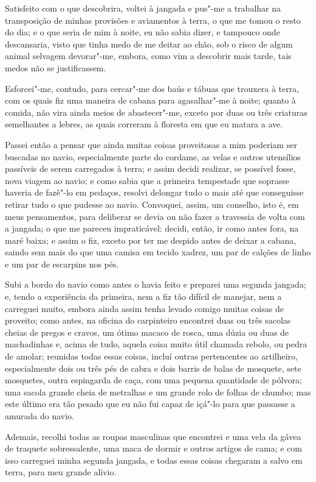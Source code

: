 Satisfeito com o que descobrira, voltei à jangada e pus"-me a trabalhar
na transposição de minhas provisões e aviamentos à terra, o que me tomou
o resto do dia; e o que seria de mim à noite, eu não sabia dizer, e
tampouco onde descansaria, visto que tinha medo de me deitar ao chão,
sob o risco de algum animal selvagem devorar"-me, embora, como vim a
descobrir mais tarde, tais medos não se justificassem.

Esforcei"-me, contudo, para cercar"-me dos baús e tábuas que trouxera à
terra, com os quais fiz uma maneira de cabana para agasalhar"-me à noite;
quanto à comida, não vira ainda meios de abastecer"-me, exceto por duas
ou três criaturas semelhantes a lebres, as quais correram à floresta em
que eu matara a ave.

Passei então a pensar que ainda muitas coisas proveitosas a mim poderiam
ser buscadas no navio, especialmente parte do cordame, as velas e outros
utensílios passíveis de serem carregados à terra; e assim decidi
realizar, se possível fosse, nova viagem ao navio; e como sabia que a
primeira tempestade que soprasse haveria de fazê"-lo em pedaços, resolvi
delongar tudo o mais até que conseguisse retirar tudo o que pudesse ao
navio. Convoquei, assim, um conselho, isto é, em meus pensamentos, para
deliberar se devia ou não fazer a travessia de volta com a jangada; o
que me pareceu impraticável: decidi, então, ir como antes fora, na maré
baixa; e assim o fiz, exceto por ter me despido antes de deixar a
cabana, saindo sem mais do que uma camisa em tecido xadrez, um par de
calções de linho e um par de escarpins nos pés.

Subi a bordo do navio como antes o havia feito e preparei uma segunda
jangada; e, tendo a experiência da primeira, nem a fiz tão difícil de
manejar, nem a carreguei muito, embora ainda assim tenha levado comigo
muitas coisas de proveito; como antes, na oficina do carpinteiro
encontrei duas ou três sacolas cheias de pregos e cravos, um ótimo
macaco de rosca, uma dúzia ou duas de machadinhas e, acima de tudo,
aquela coisa muito útil chamada rebolo, ou pedra de amolar; reunidas
todas essas coisas, incluí outras pertencentes ao artilheiro,
especialmente dois ou três pés de cabra e dois barris de balas de
mosquete, sete mosquetes, outra espingarda de caça, com uma pequena
quantidade de pólvora; uma sacola grande cheia de metralhas e um grande
rolo de folhas de chumbo; mas este último era tão pesado que eu não fui
capaz de içá"-lo para que passasse a amurada do navio.

Ademais, recolhi todas as roupas masculinas que encontrei e uma vela da
gávea de traquete sobressalente, uma maca de dormir e outros artigos de
cama; e com isso carreguei minha segunda jangada, e todas essas coisas
chegaram a salvo em terra, para meu grande alívio.


